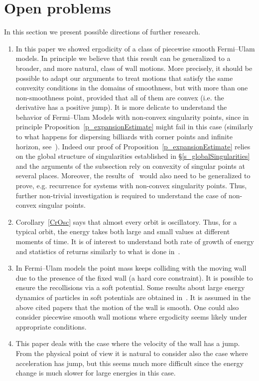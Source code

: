 \documentclass[AHL, Unicode, longabstracts,published]{cedram}
\newcommand*{\relabel}{\renewcommand{\labelenumi}{(\theenumi)}}
\newcommand*{\Romanenumi}{\renewcommand*{\theenumi}{\Roman{enumi}}\relabel}
\begin{document}
\section{Open problems}\label{s_conclusions}
In this section we present possible directions of further research.
\begin{enumerate}\Romanenumi
\item In this paper we showed ergodicity of a class of piecewise smooth Fermi--Ulam models. In principle we believe that this result can be generalized to a broader, and more natural, class of wall motions. More precisely, it should be possible to adapt our arguments to treat motions that satisfy the same convexity conditions in the domains of smoothness, but with more than one non-smoothness point, provided that all of them are convex (i.e. the derivative has a positive jump). It is more delicate to understand the behavior of Fermi--Ulam Models with non-convex singularity points, since in principle Proposition~\ref{p_expansionEstimate} might fail in this case (similarly to what happens for dispersing billiards with corner points and infinite horizon, see~\cite{BrownNandori}). Indeed our proof of Proposition~\ref{p_expansionEstimate} relies on the global structure of singularities established in \S \ref{s_globalSingularities} and the arguments of the subsection rely on convexity of singular points at several places. Moreover, the results of~\cite{fum} would also need to be generalized to prove, e.g. recurrence for systems with non-convex singularity points. Thus, further non-trivial investigation is required to understand the case of non-convex singular points.

\item Corollary~\ref{CrOsc} says that almost every orbit is oscillatory. Thus, for a typical orbit, the energy takes both large and small values at different moments of time. It is of interest to understand both rate of growth of energy and statistics of returns similarly to what is done in~\cite{CD2, DSV}.

\item In Fermi--Ulam models the point mass keeps colliding with the moving wall due to the presence of the fixed wall (a hard core constraint). It is possible to ensure the recollisions via a soft potential. Some results about large energy dynamics of particles in soft potentials are obtained in~\cite{D1, P3,dS}. It is assumed in the above cited papers that the motion of the wall is smooth. One could also consider piecewise smooth wall motions where ergodicity seems likely under appropriate conditions.

\item This paper deals with the case where the velocity of the wall has a jump. From the physical point of view it is natural to consider also the case where acceleration has jump, but this seems much more difficult since the energy change is much slower for large energies in this case.
\end{enumerate}
\end{document}
